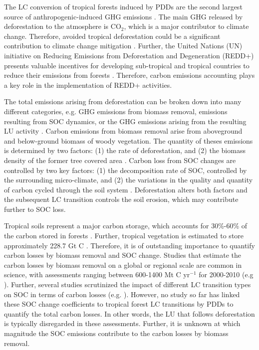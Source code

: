 	The \ac{LC} conversion of tropical forests induced by \acp{PDD} are the second largest source of anthropogenic-induced \ac{GHG} emissions \citep{Don2010}. The main \ac{GHG} released by deforestation to the atmosphere is CO$_2$, which is a major contributor to climate change. Therefore, avoided tropical deforestation could be a significant contribution to climate change mitigation \citep{Don2010}. Further, the United Nations (UN) initiative on Reducing Emissions from Deforestation and Degeneration (REDD+) presents valuable incentives for developing sub-tropical and tropical countries to reduce their emissions from forests \citep{Avitabile2016}. Therefore, carbon emissions accounting plays a key role in the implementation of REDD+ activities.

	The total emissions arising from deforestation can be broken down into many different categories, e.g. \ac{GHG} emissions from biomass removal, emissions resulting from \ac{SOC} dynamics, or the \ac{GHG} emissions arising from the resulting \ac{LU} activity \citep{Avitabile2016}. Carbon emissions from biomass removal arise from aboveground and below-ground biomass of woody vegetation. The quantity of theses emissions is determined by two factors: (1) the rate of deforestation, and (2) the biomass density of the former tree covered area \citep{Houghton2012a}. Carbon loss from \ac{SOC} changes are controlled by two key factors: (1) the decomposition rate of \ac{SOC}, controlled by the surrounding micro-climate, and (2) the variations in the quality and quantity of carbon cycled through the soil system \citep{Don2010}. Deforestation alters both factors and the subsequent \ac{LC} transition controls the soil erosion, which may contribute further to \ac{SOC} loss.

	Tropical soils represent a major carbon storage, which accounts for 30\%-60\% of the carbon stored in forests \citep{Don2010}. Further, tropical vegetation is estimated to store approximately 228.7 Gt C \citep{Baccini2012}. Therefore, it is of outstanding importance to quantify carbon losses by biomass removal and \ac{SOC} change. Studies that estimate the carbon losses by biomass removal on a global or regional scale are common in science, with assessments ranging between 600-1400 Mt C yr$^{-1}$ for 2000-2010 (e.g \citet{Houghton2012,Achard2014,Sy2015,Baccini2012}). Further, several studies scrutinized the impact of different \ac{LC} transition types on \ac{SOC} in terms of carbon losses (e.g. \citet{Don2010,Rahman2018,Villarino2017}). However, no study so far has linked these \ac{SOC} change coefficients to tropical forest \ac{LC} transitions by \acp{PDD} to quantify the total carbon losses. In other words, the \ac{LU} that follows deforestation is typically disregarded in these assessments. Further, it is unknown at which magnitude the \ac{SOC} emissions contribute to the carbon losses by biomass removal.

